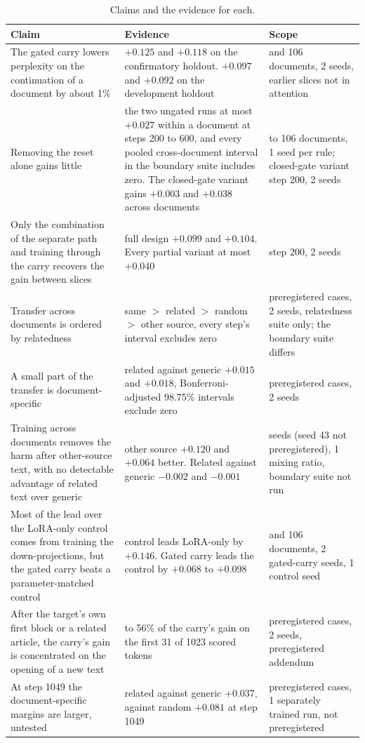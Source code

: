 \documentclass[10pt]{article} %
\begin{document}
\begin{table}[tbp]
  \centering
  \footnotesize
  \begin{tabularx}{\linewidth}{>{\raggedright\arraybackslash}p{4.6cm}>{\raggedright\arraybackslash}X>{\raggedright\arraybackslash}p{2.6cm}}
    \toprule
    Claim & Evidence & Scope \\
    \midrule
    The gated carry lowers perplexity on the continuation of a document by about 1\% & $+0.125$ and $+0.118$ on the confirmatory holdout. $+0.097$ and $+0.092$ on the development holdout & 73 and 106 documents, 2 seeds, earlier slices not in attention \\
    Removing the reset alone gains little & the two ungated runs at most $+0.027$ within a document at steps 200 to 600, and every pooled cross-document interval in the boundary suite includes zero. The closed-gate variant gains $+0.003$ and $+0.038$ across documents & 24 to 106 documents, 1 seed per rule; closed-gate variant step 200, 2 seeds \\
    Only the combination of the separate path and training through the carry recovers the gain between slices & full design $+0.099$ and $+0.104$. Every partial variant at most $+0.040$ & step 200, 2 seeds \\
    Transfer across documents is ordered by relatedness & same $>$ related $>$ random $>$ other source, every step's interval excludes zero & 200 preregistered cases, 2 seeds, relatedness suite only; the boundary suite differs \\
    A small part of the transfer is document-specific & related against generic $+0.015$ and $+0.018$, Bonferroni-adjusted 98.75\% intervals exclude zero & 200 preregistered cases, 2 seeds \\
    Training across documents removes the harm after other-source text, with no detectable advantage of related text over generic & other source $+0.120$ and $+0.064$ better. Related against generic $-0.002$ and $-0.001$ & 2 seeds (seed 43 not preregistered), 1 mixing ratio, boundary suite not run \\
    Most of the lead over the LoRA-only control comes from training the down-projections, but the gated carry beats a parameter-matched control & control leads LoRA-only by $+0.146$. Gated carry leads the control by $+0.068$ to $+0.098$ & 73 and 106 documents, 2 gated-carry seeds, 1 control seed \\
    After the target's own first block or a related article, the carry's gain is concentrated on the opening of a new text & 54 to 56\% of the carry's gain on the first 31 of 1023 scored tokens & 200 preregistered cases, 2 seeds, preregistered addendum \\
    At step 1049 the document-specific margins are larger, untested & related against generic $+0.037$, against random $+0.081$ at step 1049 & 200 preregistered cases, 1 separately trained run, not preregistered \\
    \bottomrule
  \end{tabularx}
    \caption{Claims and the evidence for each.}
  \label{tab-claims}
\end{table}
\end{document}

